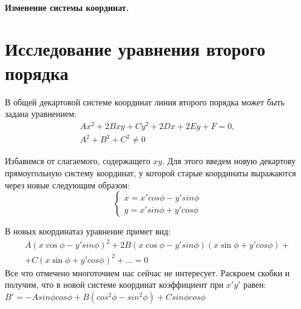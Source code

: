 \documentclass[a4paper]{article}
\numberwithin{equation}{section}
\begin{document}
\paragraph{Изменение системы координат.}

\newpage

\section{Исследование уравнения второго порядка}
В общей декартовой системе координат линия второго порядка может быть задана уравнением:
\begin{equation}
    \begin{gathered}
        Ax^2 + 2Bxy + Cy^2 + 2Dx + 2Ey + F = 0, \\
        A^2 + B^2 + C^2 \neq 0
    \end{gathered}
\end{equation}

Избавимся от слагаемого, содержащего $xy$.
Для этого введем новую декартову прямоугольную систему координат, у которой старые координаты выражаются через новые следующим образом:
\begin{equation}
    \begin{cases}  x = x' cos \phi - y' sin \phi \\ y = x' sin \phi + y' cos \phi \end{cases}
\end{equation}

В новых координатаз уравнение примет вид:
\begin{equation}
    \begin{gathered}
        A(x\cos \phi - y' sin \phi)^2 + 2B(x\cos \phi - y' sin \phi)(x\sin \phi + y' cos \phi) + \\ + C(x\sin \phi + y' cos \phi)^2 + ... = 0
    \end{gathered}
\end{equation}
Все что отмечено многоточием нас сейчас не интересует.
Раскроем скобки и получим, что в новой системе координат коэффициент при $x'y'$ равен:
$ B' = -Asin \phi cos \phi + B(cos^2 \phi - sin^2 \phi) + Csin \phi cos \phi $
\end{document}

